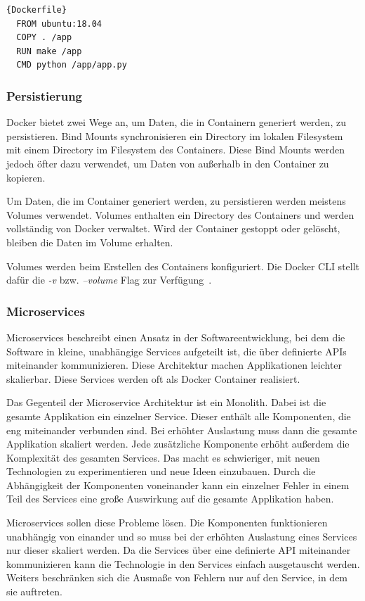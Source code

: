  \begin{lstlisting}[label={lst:Dockerfile}]{Dockerfile}
  FROM ubuntu:18.04
  COPY . /app
  RUN make /app
  CMD python /app/app.py
 \end{lstlisting}

 \subsubsection{Persistierung}
 Docker bietet zwei Wege an, um Daten, die in Containern generiert werden, zu persistieren.
 Bind Mounts synchronisieren ein Directory im lokalen Filesystem mit einem Directory im Filesystem des Containers.
 Diese Bind Mounts werden jedoch öfter dazu verwendet, um Daten von außerhalb in den Container zu kopieren.

 Um Daten, die im Container generiert werden, zu persistieren werden meistens Volumes verwendet.
 Volumes enthalten ein Directory des Containers und werden vollständig von Docker verwaltet.
 Wird der Container gestoppt oder gelöscht, bleiben die Daten im Volume erhalten.

 Volumes werden beim Erstellen des Containers konfiguriert.
 Die Docker CLI stellt dafür die \textit{-v} bzw. \textit{--volume} Flag zur Verfügung~\cite{docker-volumes}.

 \subsubsection{Microservices}
 Microservices beschreibt einen Ansatz in der Softwareentwicklung, bei dem die Software in kleine, unabhängige
 Services aufgeteilt ist, die über definierte APIs miteinander kommunizieren.
 Diese Architektur machen Applikationen leichter skalierbar.
 Diese Services werden oft als Docker Container realisiert.

 Das Gegenteil der Microservice Architektur ist ein Monolith.
 Dabei ist die gesamte Applikation ein einzelner Service.
 Dieser enthält alle Komponenten, die eng miteinander verbunden sind.
 Bei erhöhter Auslastung muss dann die gesamte Applikation skaliert werden.
 Jede zusätzliche Komponente erhöht außerdem die Komplexität des gesamten Services.
 Das macht es schwieriger, mit neuen Technologien zu experimentieren und neue Ideen einzubauen.
 Durch die Abhängigkeit der Komponenten voneinander kann ein einzelner Fehler in einem Teil des Services eine
 große Auswirkung auf die gesamte Applikation haben.

 Microservices sollen diese Probleme lösen.
 Die Komponenten funktionieren unabhängig von einander und so muss bei der erhöhten Auslastung eines Services nur
 dieser skaliert werden.
 Da die Services über eine definierte API miteinander kommunizieren kann die Technologie in den Services einfach
 ausgetauscht werden.
 Weiters beschränken sich die Ausmaße von Fehlern nur auf den Service, in dem sie auftreten.

